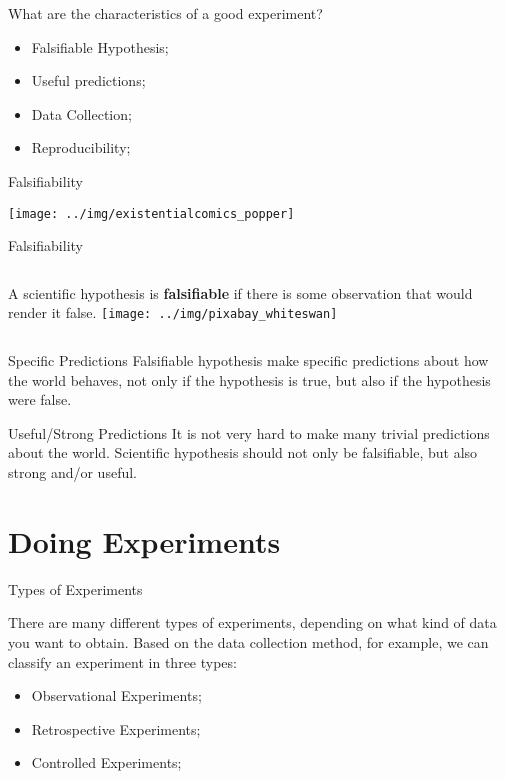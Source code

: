 \begin{frame}{What are the characteristics of a good experiment?}
  \begin{itemize}
    \item Falsifiable Hypothesis;
    \item Useful predictions;
    \item Data Collection;
    \item Reproducibility;
  \end{itemize}
\end{frame}

\begin{frame}{Falsifiability}
  \begin{center}
    \texttt{[image: ../img/existentialcomics\_popper]}
  \end{center}
\end{frame}

\begin{frame}{Falsifiability}
  \begin{columns}
    A scientific hypothesis is {\bf falsifiable} if there is some observation that would render it false.
    \texttt{[image: ../img/pixabay\_whiteswan]}
  \end{columns}
  \begin{block}{Specific Predictions}
    Falsifiable hypothesis make specific predictions about how the world behaves, not only if the hypothesis is true, but also if the hypothesis were false.
  \end{block}
  \begin{block}{Useful/Strong Predictions}
    It is not very hard to make many trivial predictions about the world. Scientific hypothesis should not only be falsifiable, but also strong and/or useful.
  \end{block}
\end{frame}

\section{Doing Experiments}
\begin{frame}{Types of Experiments}

  There are many different types of experiments, depending on what kind of data you want to obtain. Based on the data collection method, for example, we can classify an experiment in three types:
  \bigskip

  \begin{itemize}
    \item Observational Experiments;
    \item Retrospective Experiments;
    \item Controlled Experiments;
  \end{itemize}
\end{frame}

